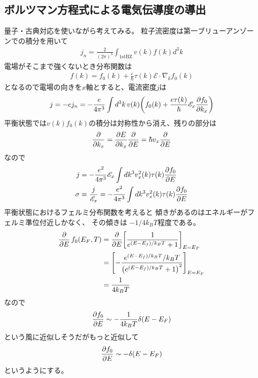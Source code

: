 \documentclass[11pt,dvipdfmx,a4paper]{jsarticle}
\begin{document}
\subsection{ボルツマン方程式による電気伝導度の導出}
量子・古典対応を使いながら考えてみる。
粒子流密度は第一ブリューアンゾーンでの積分を用いて
\begin{align}
    j_n = \frac{2}{(2\pi)^3}\int_{\text{1stBZ}} v(k)f(k) d^3k %
\end{align}
電場がそこまで強くないとき分布関数は
\begin{align}
    f(k) = f_0(k) + \frac{e}{\hbar}\tau(k)\mathscr{E}\cdot\nabla_kf_0(k)
\end{align}
となるので電場の向きを\(x\)軸とすると、電流密度\(j\)は
\begin{align}
    j = -ej_n = -\frac{e}{4\pi^3} \int d^3k\,v(k) \qty(f_0(k)
    +\frac{e\tau(k)}{\hbar}\mathscr{E}_x\pdv{f_0}{k_x}) %
\end{align}
平衡状態では\(v(k)f_0(k)\)の積分は対称性から消え、残りの部分は
\begin{align}
    \pdv{k_x} = \pdv{E}{k_x}\pdv{E} = \hbar v_x \pdv{E} %
\end{align}
なので
\begin{align}
    j &= -\frac{e^2}{4\pi^3}\mathscr{E}_x\int dk^3 v_x^2(k)\tau(k)\pdv{f_0}{E} \\%
    \sigma &= \frac{j}{\mathscr{E}_x} = -\frac{e^2}{4\pi^3}\int dk^3 v_x^2(k)\tau(k)\pdv{f_0}{E} %
\end{align}
平衡状態におけるフェルミ分布関数を考えると
傾きがあるのはエネルギーがフェルミ準位付近しかなく、
その傾きは \(-1/4k_BT\)程度である。
\begin{align}
    \pdv{E}\,f_0(E_F,T) &= \pdv{E}\qty[\frac{1}{e^{(E-E_f)/k_BT}+1}]_{E=E_F}\\
    &=\qty[-\frac{e^{(E-E_f)/k_BT}/k_BT}{\qty(e^{(E-E_f)/k_BT}+1)^2}]_{E=E_F}\\
    &=\frac{1}{4k_BT}
\end{align}
なので
\begin{align}
    \pdv{f_0}{E} \sim -\frac{1}{4k_BT}\delta(E-E_F)
\end{align}
という風に近似しそうだがもっと近似して
\begin{align}
    \pdv{f_0}{E} \sim -\delta(E-E_F) %
\end{align}
というようにする。%
\end{document}
